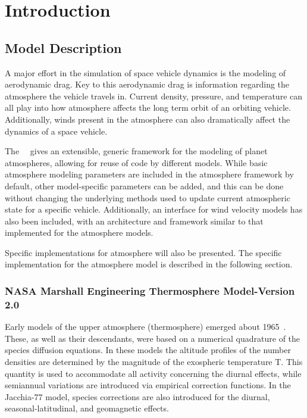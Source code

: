 

\setcounter{chapter}{0}

\chapter{Introduction}\label{ch:intro}


\section{Model Description}

A major effort in the simulation of space vehicle dynamics is the modeling of
aerodynamic drag. Key to this aerodynamic drag is information regarding the
atmosphere the vehicle travels in. Current density, pressure, and temperature
can all play into how atmosphere affects the long term orbit of an orbiting vehicle.
Additionally, winds present in the atmosphere can also dramatically affect
the dynamics of a space vehicle.

The \JEODid\ \atmosphereDesc\ gives an extensible, generic framework for the
modeling of planet atmospheres, allowing for reuse of code by different models.
While basic atmosphere modeling parameters are included in the atmosphere
framework by default,
other model-specific parameters can be added, and this can be done without changing the underlying methods
used to update current atmospheric state for a specific vehicle. Additionally,
an interface for wind velocity models has also been included, with an architecture
and framework similar to that implemented for the atmosphere models.

Specific implementations for atmosphere will also be presented.
The specific implementation for the atmosphere
model is described in the following section.

\subsection{NASA Marshall Engineering Thermosphere Model-Version 2.0}

Early models of the upper atmosphere (thermosphere) emerged
about 1965~\cite{Jacchia}.  These, as well as their descendants,
were based on a numerical quadrature of the species diffusion equations.
In these models the altitude profiles of the number densities are determined
by the magnitude of the exospheric temperature T. This quantity is used to
accommodate all activity concerning the diurnal effects, while semiannual
variations are introduced via empirical correction functions.  In the
Jacchia-77 model, species corrections are also introduced for the diurnal,
seasonal-latitudinal, and geomagnetic effects.

